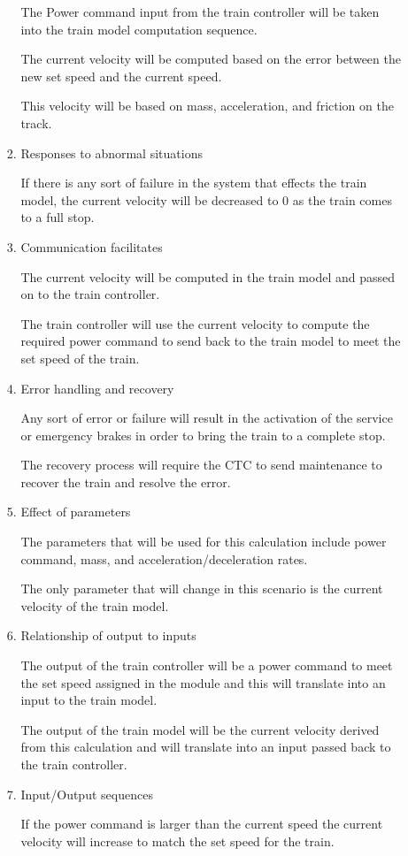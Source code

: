 \documentclass[11pt]{article}
\begin{document}
\begin{enumerate}
\begin{enumerate}
\begin{enumerate}
The Power command input from the train controller will be taken into the train model computation sequence.

The current velocity will be computed based on the error between the new set speed and the current speed.

This velocity will be based on mass, acceleration, and friction on the track.
\item Responses to abnormal situations
\label{sec-3-1-4-1-2-3}

If there is any sort of failure in the system that effects the train model, the current velocity will be decreased to 0 as the train comes to a full stop.
\item Communication facilitates
\label{sec-3-1-4-1-2-4}

The current velocity will be computed in the train model and passed on to the train controller.

The train controller will use the current velocity to compute the required power command to send back to the train model to meet the set speed of the train.
\item Error handling and recovery
\label{sec-3-1-4-1-2-5}

Any sort of error or failure will result in the activation of the service or emergency brakes in order to bring the train to a complete stop. 

The recovery process will require the CTC to send maintenance to recover the train and resolve the error.
\item Effect of parameters
\label{sec-3-1-4-1-2-6}

The parameters that will be used for this calculation include power command, mass, and acceleration/deceleration rates.

The only parameter that will change in this scenario is the current velocity of the train model.
\item Relationship of output to inputs
\label{sec-3-1-4-1-2-7}

The output of the train controller will be a power command to meet the set speed assigned in the module and this will translate into an input to the train model.

The output of the train model will be the current velocity derived from this calculation and will translate into an input passed back to the train controller.
\item Input/Output sequences
\label{sec-3-1-4-1-2-8}

If the power command is larger than the current speed the current velocity will increase to match the set speed for the train.


\end{enumerate}
\end{enumerate}
\end{enumerate}
\end{document}
